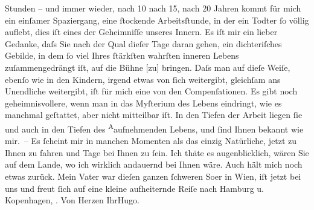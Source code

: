 \begin{ledgroupsized}[t]{13cm}
               Stunden – und immer wieder, nach 10 nach 15, nach 20 Jahren kommt für mich ein
               einſamer Spaziergang, eine ſtockende Arbeitsſtunde, in der ein Todter ſo völlig
               auflebt, dies iſt eines der Geheimniſſe unseres Innern.\pend
           \pstart
           Es iſt mir ein lieber Gedanke, daſs Sie nach der Qual dieſer Tage daran {\pb}gehen, ein dichteriſches Gebilde, in dem ſo viel Ihres ſtärkſten
               wahrſten inneren Lebens zuſammengedrängt iſt, auf die Bühne {[}zu{]}
               bringen. Daſs man auf dieſe Weiſe, ebenſo wie in den Kindern, irgend etwas von ſich
               weitergibt, gleichſam ans Unendliche weitergibt, iſt für mich eine von den
               Compenſationen. Es gibt noch geheimnisvollere, wenn man in das Myſterium des Lebens
               eindringt, wie es manchmal geſtattet, aber {\pb}nicht mitteilbar iſt. In den
               Tiefen der Arbeit liegen ſie und auch in den Tiefen des \substVorne{}\textsuperscript{A}\substDazwischen{}a\substHinten{}ufnehmenden Lebens, und ſind Ihnen bekannt wie mir. – Es ſcheint mir in
               manchen Momenten als das einzig Natürliche, jetzt zu Ihnen zu fahren und Tage bei
               Ihnen zu ſein. Ich thäte es augenblicklich, wären Sie auf dem Lande, wo ich wirklich
               andauernd bei Ihnen wäre.\pend
           \pstart
           Auch hält mich noch etwas zurück. Mein Vater war dieſen ganzen ſchweren So{\geminationm}er in Wien,
               iſt jetzt bei uns und freut ſich auf eine kleine aufheiternde Reiſe nach Hamburg u. Kopenhagen, \label{T_L02027_1v}\label{T_L02027_1h}{ }\label{T_L02027_2v}\label{T_L02027_2h}.\pend
           \pstart Von Herzen Ihr\spacefill\mbox{Hugo.}\pend{}
         
         \endnumbering{}\end{ledgroupsized}  \newcommand{\dateiname}{L02027}\newcommand{\titel}{Hugo von Hofmannsthal an Arthur Schnitzler, 11. 9. 1911}\newcommand{\editorInnen}{Martin Anton Müller und Gerd-Hermann Susen}
      